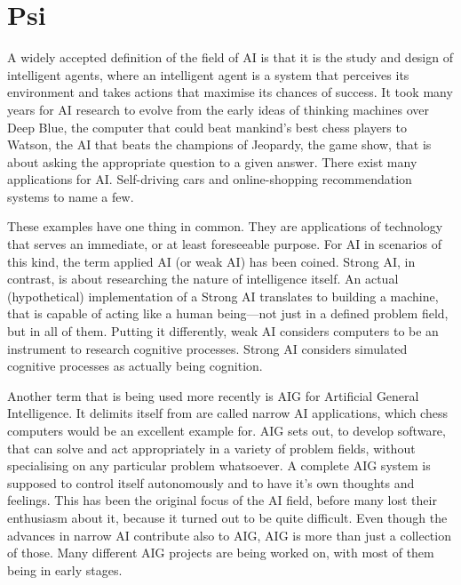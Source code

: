 \chapter{Psi}

A widely accepted definition of the field of AI is that it is the study and design of intelligent agents, where an intelligent agent is a system that perceives its environment and takes actions that maximise its chances of success. It took many years for AI research to evolve from the early ideas of thinking machines over Deep Blue, the computer that could beat mankind's best chess players to Watson, the AI that beats the champions of Jeopardy, the game show, that is about asking the appropriate question to a given answer. There exist many applications for AI. Self-driving cars and online-shopping recommendation systems to name a few.

These examples have one thing in common. They are applications of technology that serves an immediate, or at least foreseeable purpose. For AI in scenarios of this kind, the term applied AI (or weak AI) has been coined. Strong AI, in contrast, is about researching the nature of intelligence itself. An actual (hypothetical) implementation of a Strong AI translates to building a machine, that is capable of acting like a human being---not just in a defined problem field, but in all of them. Putting it differently, weak AI considers computers to be an instrument to research cognitive processes. Strong AI considers simulated cognitive processes as actually being cognition.

Another term that is being used more recently is AIG for Artificial General Intelligence. It delimits itself from are called narrow AI applications, which chess computers would be an excellent example for. AIG sets out, to develop software, that can solve and act appropriately in a variety of problem fields, without specialising on any particular problem whatsoever. A complete AIG system is supposed to control itself autonomously and to have it's own thoughts and feelings. This has been the original focus of the AI field, before many lost their enthusiasm about it, because it turned out to be quite difficult. Even though the advances in narrow AI contribute also to AIG, AIG is more than just a collection of those. Many different AIG projects are being worked on, with most of them being in early stages.\cite{goertzel2007artificial}

